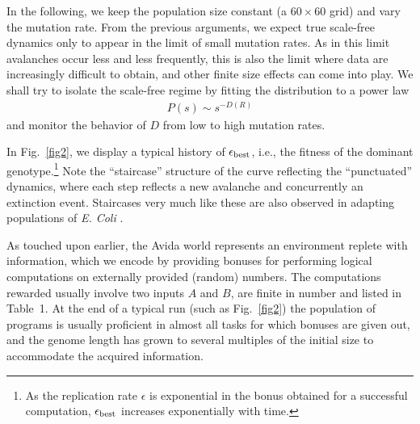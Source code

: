 \documentclass[letterpaper]{article}
\begin{document}
In the following, we keep the population size constant (a $60\times60$
grid) and vary the mutation rate. From the previous arguments, we
expect true scale-free dynamics only to appear in the limit of small
mutation rates.  As in this limit avalanches occur less and less
frequently, this is also the limit where data are increasingly
difficult to obtain, and other finite size effects can come into play.
We shall try to isolate the scale-free regime by fitting the
distribution to a power law
\begin{eqnarray}
P(s)\sim s^{-D(R)}\label{power}
\end{eqnarray}
and monitor the behavior of $D$ from low to high mutation rates.

In Fig.~\ref{fig2}, we display a typical history of $\epsilon_{\rm
best}$, i.e., the fitness of the dominant genotype.\footnote{As the
replication rate $\epsilon$ is exponential in the bonus obtained for a
successful computation, $\epsilon_{\rm best}$ increases exponentially
with time.}  Note the ``staircase'' structure of the curve reflecting
the ``punctuated'' dynamics, where each step reflects a new avalanche
and concurrently an extinction event. Staircases very much like these
are also observed in adapting populations of {\it E. Coli}
\citep{LT94}.

As touched upon earlier, the Avida world represents an environment
replete with information, which we encode by providing bonuses for
performing logical computations on externally provided (random)
numbers. The computations rewarded usually involve two inputs $A$ and
$B$, are finite in number and listed in Table~1. At the end of a
typical run (such as Fig.~\ref{fig2}) the population of programs is
usually proficient in almost all tasks for which bonuses are given
out, and the genome length has grown to several multiples of the
initial size to accommodate the acquired information.

\begin{table}[h]
\vskip 0.25cm
\caption{Logical calculations on random inputs $A$ and $B$ rewarded,
bonuses, and difficulty (in minimum number of {\tt nand} instructions
required). Bonuses $b_i$ increase the speed of a CPU by a factor
$\nu_i=1+2^{b_i-3}$.}
\end{table}
\end{document}
